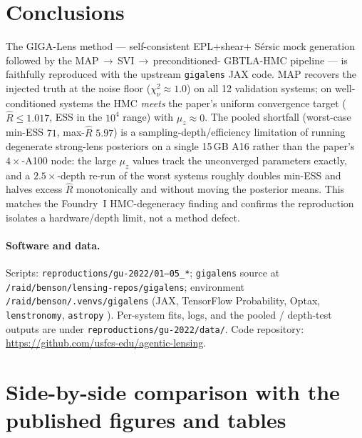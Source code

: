 \documentclass[11pt,letterpaper]{article}
\newcommand{\Rhat}{\ensuremath{\hat{R}}}
\newcommand{\chisq}{\ensuremath{\chi^2_\nu}}
\newcommand{\muz}{\ensuremath{\mu_z}}
\begin{document}
\section{Conclusions}

The GIGA-Lens \citep{gu2022gigalens} method --- self-consistent EPL$+$shear$+$%
S\'ersic mock generation followed by the MAP\,$\to$\,SVI\,$\to$\,preconditioned-%
GBTLA-HMC pipeline --- is faithfully reproduced with the upstream
\texttt{gigalens} JAX code. MAP recovers the injected truth at the noise
floor ($\chisq\approx1.0$) on all 12 validation systems; on well-conditioned
systems the HMC \emph{meets} the paper's uniform convergence target
($\Rhat\le1.017$, ESS in the $10^4$ range) with $\muz\approx0$. The pooled
shortfall (worst-case min-ESS $71$, max-$\Rhat$ $5.97$) is a
sampling-depth/efficiency limitation of running degenerate strong-lens
posteriors on a single 15\,GB A16 rather than the paper's $4\times$-A100
node: the large $\muz$ values track the unconverged parameters exactly, and a
$2.5\times$-depth re-run of the worst systems roughly doubles min-ESS and
halves excess $\Rhat$ monotonically and without moving the posterior means.
This matches the Foundry~I HMC-degeneracy finding and confirms the
reproduction isolates a hardware/depth limit, not a method defect.

\paragraph{Software and data.} Scripts:
\texttt{reproductions/gu-2022/01--05\_*}; \texttt{gigalens} source at
\texttt{/raid/benson/lensing-repos/gigalens}; environment
\texttt{/raid/benson/.venvs/gigalens} (JAX, TensorFlow Probability, Optax,
\texttt{lenstronomy}, \texttt{astropy} \citep{astropy2022}). Per-system fits,
logs, and the pooled / depth-test outputs are under
\texttt{reproductions/gu-2022/data/}. Code repository:
\url{https://github.com/usfcs-edu/agentic-lensing}.

\clearpage
\appendix
\section{Side-by-side comparison with the published figures and tables}
\label{app:compare}
\end{document}
